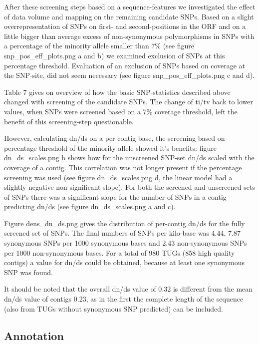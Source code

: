 \documentclass[10pt]{bmc_article}
\newenvironment{bmcformat}{\begin{raggedright}\baselineskip20pt\sloppy\setboolean{publ}{false}}{\end{raggedright}\baselineskip20pt\sloppy}
\begin{document}
\begin{bmcformat}
After these screening steps based on a sequence-features we
investigated the effect of data volume and mapping on the remaining
candidate SNPs. Based on a slight overrepresentation of SNPs on first-
and second-positions in the ORF and on a little bigger than average
excess of non-synonymous polymorphisms in SNPs with a percentage of
the minority allele smaller than 7\% (see figure
snp\_pos\_eff\_plots.png a and b) we examined exclusion of SNPs at
this percentage threshold. Evaluation of an exclusion of SNPs based on
coverage at the SNP-site, did not seem necessary (see figure
snp\_pos\_eff\_plots.png c and d).

Table 7 gives on overview of how the basic SNP-statistics described
above changed with screening of the candidate SNPs. The change of
ti/tv back to lower values, when SNPs were screened based on a 7\%
coverage threshold, left the benefit of this screening-step
questionable.

However, calculating dn/ds on a per contig base, the screening based
on percentage threshold of the minority-allele showed it's benefits:
figure dn\_ds\_scales.png b shows how for the unscreened SNP-set dn/ds
scaled with the coverage of a contig. This correlation was not longer
present if the percentage screening was used (see figure
dn\_ds\_scales.png d, the linear model had a slightly negative
non-significant slope). For both the screened and unscreened sets of
SNPs there was a significant slope for the number of SNPs in a contig
predicting dn/ds (see figure dn\_ds\_scales.png a and c).

Figure dens\_dn\_ds.png gives the distribution of per-contig dn/ds for
the fully screened set of SNPs. The final numbers of SNPs per
kilo-base was 4.44,
7.87 synonymous SNPs per 1000 synonymous
bases and 2.43 non-synonymous SNPs per
1000 non-synonymous bases. For a total of
980 TUGs
(858 high
  quality contigs) a value for dn/ds could be obtained, because at
  least one synonymous SNP was found.

  It should be noted that the overall dn/ds value of
  0.32 is different from the mean dn/ds value of contigs
  0.23, as in the first the
  complete length of the sequence (also from TUGs without synonymous
  SNP predicted) can be included.

\subsection*{Annotation}



\end{bmcformat}
\end{document}

